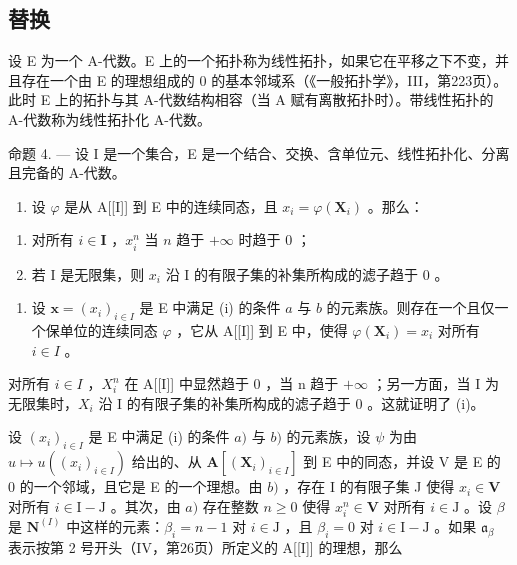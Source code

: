 \subsection{替换}

设 E 为一个 A-代数。E 上的一个拓扑称为线性拓扑，如果它在平移之下不变，并且存在一个由 E 的理想组成的 0 的基本邻域系（《一般拓扑学》，III，第223页）。此时 E 上的拓扑与其 A-代数结构相容（当 A 赋有离散拓扑时）。带线性拓扑的 A-代数称为线性拓扑化 A-代数。

命题 4. --- 设 I 是一个集合，E 是一个结合、交换、含单位元、线性拓扑化、分离且完备的 A-代数。

\begin{enumerate}
\def\labelenumi{(\roman{enumi})}
\tightlist
\item
  设 \(\varphi\) 是从 A{[}{[}I{]}{]} 到 E 中的连续同态，且 \(x_{i} = \varphi (\mathbf{X}_{i})\) 。那么：
\end{enumerate}

\begin{enumerate}
\def\labelenumi{(\alph{enumi})}
\item
  对所有 \(i \in \mathbf{I}\) ，\(x_{i}^{n}\) 当 \(n\) 趋于 \(+\infty\) 时趋于 0 ；
\item
  若 I 是无限集，则 \(x_{i}\) 沿 I 的有限子集的补集所构成的滤子趋于 0 。
\end{enumerate}

\begin{enumerate}
\def\labelenumi{(\roman{enumi})}
\setcounter{enumi}{1}
\tightlist
\item
  设 \(\mathbf{x} = (x_i)_{i\in I}\) 是 E 中满足 (i) 的条件 \(a\) 与 \(b\) 的元素族。则存在一个且仅一个保单位的连续同态 \(\varphi\) ，它从 A{[}{[}I{]}{]} 到 E 中，使得 \(\varphi (\mathbf{X}_i) = x_i\) 对所有 \(i\in I\) 。
\end{enumerate}

对所有 \(i \in I\) ，\(X_{i}^{n}\) 在 A{[}{[}I{]}{]} 中显然趋于 0 ，当 n 趋于 \(+\infty\) ；另一方面，当 I 为无限集时，\(X_{i}\) 沿 I 的有限子集的补集所构成的滤子趋于 0 。这就证明了 (i)。

设 \((x_{i})_{i\in I}\) 是 E 中满足 (i) 的条件 \(a)\) 与 \(b)\) 的元素族，设 \(\psi\) 为由 \(u\mapsto u((x_i)_{i\in I})\) 给出的、从 \(\mathbf{A}[(\mathbf{X}_i)_{i\in I}]\) 到 E 中的同态，并设 V 是 E 的 0 的一个邻域，且它是 E 的一个理想。由 \(b)\) ，存在 I 的有限子集 J 使得 \(x_{i}\in \mathbf{V}\) 对所有 \(i\in \mathrm{I - J}\) 。其次，由 \(a)\) 存在整数 \(n\geqslant 0\) 使得 \(x_{i}^{n}\in \mathbf{V}\) 对所有 \(i\in \mathrm{J}\) 。设 \(\beta\) 是 \(\mathbf{N}^{(I)}\) 中这样的元素：\(\beta_{i} = n - 1\) 对 \(i\in \mathrm{J}\) ，且 \(\beta_{i} = 0\) 对 \(i\in \mathrm{I - J}\) 。如果 \(\mathfrak{a}_{\beta}\) 表示按第 2 号开头（IV，第26页）所定义的 A{[}{[}I{]}{]} 的理想，那么

